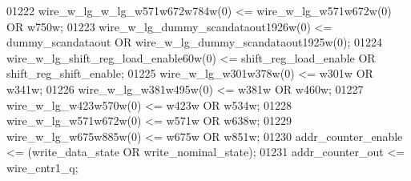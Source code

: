 \begin{DoxyCode}
{01222     \textcolor{vhdlchar}{wire_w_lg_w_lg_w571w672w784w}\textcolor{vhdlchar}{(}\textcolor{vhdllogic}{}\textcolor{vhdllogic}{0}\textcolor{vhdlchar}{)} \textcolor{vhdlchar}{<=} \textcolor{vhdlchar}{wire_w_lg_w571w672w}\textcolor{vhdlchar}{(}\textcolor{vhdllogic}{}\textcolor{vhdllogic}{0}\textcolor{vhdlchar}{)} \textcolor{keywordflow}{OR} \textcolor{vhdlchar}{w750w};
01223     \textcolor{vhdlchar}{wire_w_lg_dummy_scandataout1926w}\textcolor{vhdlchar}{(}\textcolor{vhdllogic}{}\textcolor{vhdllogic}{0}\textcolor{vhdlchar}{)} \textcolor{vhdlchar}{<=} \textcolor{vhdlchar}{dummy_scandataout} \textcolor{keywordflow}{OR} \textcolor{vhdlchar}{
      wire_w_lg_dummy_scandataout1925w}\textcolor{vhdlchar}{(}\textcolor{vhdllogic}{}\textcolor{vhdllogic}{0}\textcolor{vhdlchar}{)};
01224     \textcolor{vhdlchar}{wire_w_lg_shift_reg_load_enable60w}\textcolor{vhdlchar}{(}\textcolor{vhdllogic}{}\textcolor{vhdllogic}{0}\textcolor{vhdlchar}{)} \textcolor{vhdlchar}{<=} \textcolor{vhdlchar}{shift_reg_load_enable} \textcolor{keywordflow}{OR} \textcolor{vhdlchar}{
      shift_reg_shift_enable};
01225     \textcolor{vhdlchar}{wire_w_lg_w301w378w}\textcolor{vhdlchar}{(}\textcolor{vhdllogic}{}\textcolor{vhdllogic}{0}\textcolor{vhdlchar}{)} \textcolor{vhdlchar}{<=} \textcolor{vhdlchar}{w301w} \textcolor{keywordflow}{OR} \textcolor{vhdlchar}{w341w};
01226     \textcolor{vhdlchar}{wire_w_lg_w381w495w}\textcolor{vhdlchar}{(}\textcolor{vhdllogic}{}\textcolor{vhdllogic}{0}\textcolor{vhdlchar}{)} \textcolor{vhdlchar}{<=} \textcolor{vhdlchar}{w381w} \textcolor{keywordflow}{OR} \textcolor{vhdlchar}{w460w};
01227     \textcolor{vhdlchar}{wire_w_lg_w423w570w}\textcolor{vhdlchar}{(}\textcolor{vhdllogic}{}\textcolor{vhdllogic}{0}\textcolor{vhdlchar}{)} \textcolor{vhdlchar}{<=} \textcolor{vhdlchar}{w423w} \textcolor{keywordflow}{OR} \textcolor{vhdlchar}{w534w};
01228     \textcolor{vhdlchar}{wire_w_lg_w571w672w}\textcolor{vhdlchar}{(}\textcolor{vhdllogic}{}\textcolor{vhdllogic}{0}\textcolor{vhdlchar}{)} \textcolor{vhdlchar}{<=} \textcolor{vhdlchar}{w571w} \textcolor{keywordflow}{OR} \textcolor{vhdlchar}{w638w};
01229     \textcolor{vhdlchar}{wire_w_lg_w675w885w}\textcolor{vhdlchar}{(}\textcolor{vhdllogic}{}\textcolor{vhdllogic}{0}\textcolor{vhdlchar}{)} \textcolor{vhdlchar}{<=} \textcolor{vhdlchar}{w675w} \textcolor{keywordflow}{OR} \textcolor{vhdlchar}{w851w};
01230     \textcolor{vhdlchar}{addr_counter_enable} \textcolor{vhdlchar}{<=} \textcolor{vhdlchar}{(}\textcolor{vhdlchar}{write_data_state} \textcolor{keywordflow}{OR} \textcolor{vhdlchar}{write_nominal_state}\textcolor{vhdlchar}{)};
01231     \textcolor{vhdlchar}{addr_counter_out} \textcolor{vhdlchar}{<=} \textcolor{vhdlchar}{wire_cntr1_q};
}
\end{DoxyCode}
